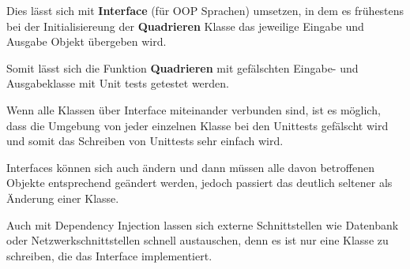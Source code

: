 Dies lässt sich mit \textbf{Interface} (für OOP Sprachen) umsetzen, 
in dem es frühestens bei der Initialisiereung der \textbf{Quadrieren} 
Klasse das jeweilige Eingabe und Ausgabe Objekt übergeben wird.

Somit lässt sich die Funktion \textbf{Quadrieren} mit gefälschten Eingabe- und Ausgabeklasse mit Unit tests getestet werden.

Wenn alle Klassen über Interface miteinander verbunden sind, 
ist es möglich, dass die Umgebung von jeder einzelnen Klasse bei den Unittests gefälscht
wird und somit das Schreiben von Unittests sehr einfach wird. 

Interfaces können sich auch ändern und dann müssen alle davon betroffenen Objekte entsprechend geändert werden, 
jedoch passiert das deutlich seltener als Änderung einer Klasse.

Auch mit Dependency Injection lassen sich externe Schnittstellen wie Datenbank oder Netzwerkschnittstellen schnell austauschen, 
denn es ist nur eine Klasse zu schreiben, die das Interface implementiert.